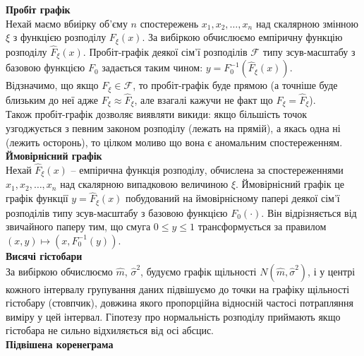 \textbf{Пробіт графік} \\

Нехай маємо вбиірку об'єму $n$ спостережень $x_1, x_2, \ldots, x_n$ над скалярною змінною $\xi$ з функцією розподілу $F_\xi(x)$. За вибіркою обчислюємо емпіричну функцію розподілу $\widehat{F}_\xi(x)$. Пробіт-графік деякої сім'ї розподілів $\mathcal{F}$ типу зсув-масштабу з базовою функцією $F_0$ задається таким чином: $y = F_0^{-1}(\widehat{F}_\xi(x))$. \\

Відзначимо, що якщо $F_\xi \in \mathcal{F}$, то пробіт-графік буде прямою (а точніше буде близьким до неї адже $F_\xi \approx \widehat{F}_\xi$, але взагалі кажучи не факт що $F_\xi = \widehat{F}_\xi$). \\

Також пробіт-графік дозволяє виявляти викиди: якщо більшість точок узгоджується з певним законом розподілу (лежать на прямій), а якась одна ні (лежить осторонь), то цілком моливо що вона є аномальним спостереженням. \\

\textbf{Ймовірнісний графік} \\

Нехай $\widehat{F}_\xi(x)$ -- емпірична функція розподілу, обчислена за спостереженнями $x_1, x_2, \ldots, x_n$ над скалярною випадковою величиною $\xi$. Ймовірнісний графік це графік функції $y = \widehat{F}_\xi(x)$ побудований на ймовірнісному папері деякої сім'ї розподілів типу зсув-масштабу з базовою функцією $F_0(\cdot)$. Він відрізняється від звичайного паперу тим, що смуга $0 \le y \le 1$ трансформується за правилом $(x, y) \mapsto (x, F_0^{-1}(y))$. \\


\textbf{Висячі гістобари} \\

За вибіркою обчислюємо $\widehat{m}$, $\widehat{\sigma}^2$, будуємо графік щільності $N(\widehat{m}, \widehat{\sigma}^2)$, і у центрі кожного інтервалу групування даних підвішуємо до точки на графіку щільності гістобару (стовпчик), довжина якого пропорційна відносній частосі потрапляння виміру у цей інтервал. Гіпотезу про нормальність розподілу приймають якщо гістобара не сильно відхиляється від осі абсцис. \\

\textbf{Підвішена коренеграма} \\

